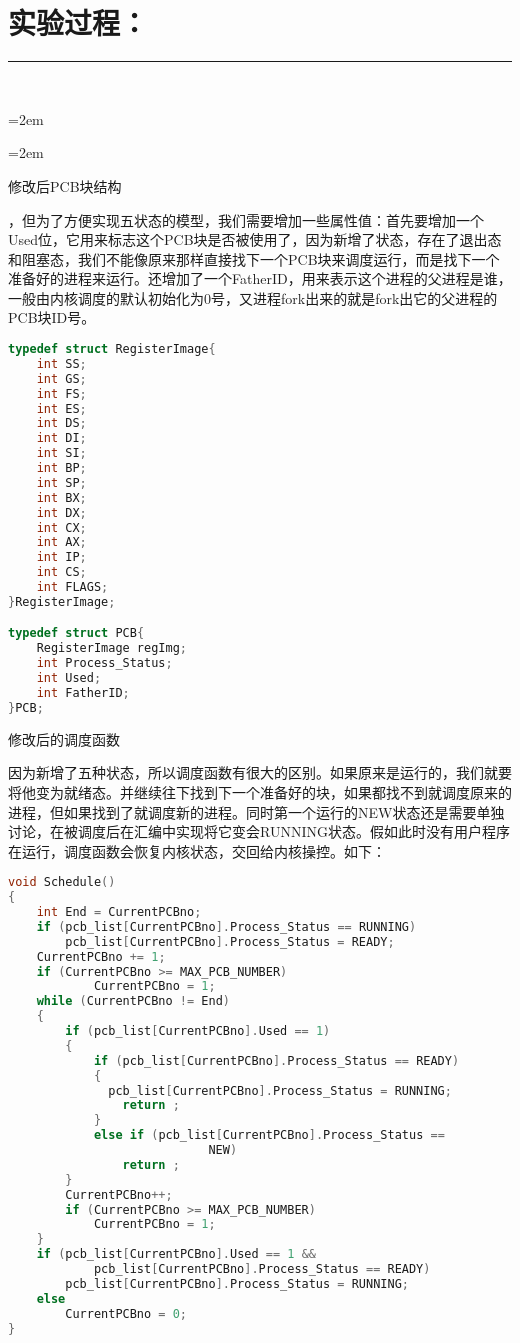 \documentclass[UTF8]{article}
\begin{document}
{\section{实验过程：}
\noindent\rule[0.2\baselineskip]{\textwidth}{0.5pt}\\[-32pt]
\heiti\setlength{\itemsep}{0em} 
\setlength{\parskip}{1em}

\parindent=2em %
\begin{enumerate}[1)]
	\parindent=2em
	{\bfseries\item 修改后PCB块结构}
，但为了方便实现五状态的模型，我们需要增加一些属性值：首先要增加一个Used位，它用来标志这个PCB块是否被使用了，因为新增了状态，存在了退出态和阻塞态，我们不能像原来那样直接找下一个PCB块来调度运行，而是找下一个准备好的进程来运行。还增加了一个FatherID，用来表示这个进程的父进程是谁，一般由内核调度的默认初始化为0号，又进程fork出来的就是fork出它的父进程的PCB块ID号。
\begin{lstlisting}[language={C}]
typedef struct RegisterImage{
	int SS;
	int GS;
	int FS;
	int ES;
	int DS;
	int DI;
	int SI;
	int BP;
	int SP;
	int BX;
	int DX;
	int CX;
	int AX;
	int IP;
	int CS;
	int FLAGS;
}RegisterImage;

typedef struct PCB{
	RegisterImage regImg;
	int Process_Status;
	int Used;
	int FatherID;
}PCB;
\end{lstlisting}

{\bfseries\item 修改后的调度函数}
\par 因为新增了五种状态，所以调度函数有很大的区别。如果原来是运行的，我们就要将他变为就绪态。并继续往下找到下一个准备好的块，如果都找不到就调度原来的进程，但如果找到了就调度新的进程。同时第一个运行的NEW状态还是需要单独讨论，在被调度后在汇编中实现将它变会RUNNING状态。假如此时没有用户程序在运行，调度函数会恢复内核状态，交回给内核操控。如下：
\begin{lstlisting}[language={C}]
void Schedule()
{   
    int End = CurrentPCBno;
    if (pcb_list[CurrentPCBno].Process_Status == RUNNING)
        pcb_list[CurrentPCBno].Process_Status = READY;
    CurrentPCBno += 1;
    if (CurrentPCBno >= MAX_PCB_NUMBER)
            CurrentPCBno = 1;
    while (CurrentPCBno != End)
    {
        if (pcb_list[CurrentPCBno].Used == 1)
        {
            if (pcb_list[CurrentPCBno].Process_Status == READY)
            {
              pcb_list[CurrentPCBno].Process_Status = RUNNING;
                return ;
            }
            else if (pcb_list[CurrentPCBno].Process_Status ==
							NEW)
                return ;
        }
        CurrentPCBno++;
        if (CurrentPCBno >= MAX_PCB_NUMBER)
            CurrentPCBno = 1;
    }
    if (pcb_list[CurrentPCBno].Used == 1 && 
    		pcb_list[CurrentPCBno].Process_Status == READY)
        pcb_list[CurrentPCBno].Process_Status = RUNNING;
    else 
        CurrentPCBno = 0;
}
\end{lstlisting}



\end{enumerate}}
\end{document}
